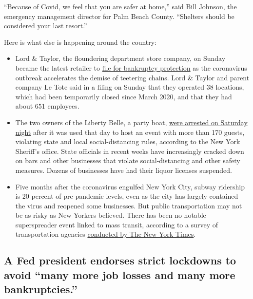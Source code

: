 ``Because of Covid, we feel that you are safer at home,'' said Bill
Johnson, the emergency management director for Palm Beach County.
``Shelters should be considered your last resort.''

Here is what else is happening around the country:

\begin{itemize}
\item
  Lord \& Taylor, the floundering department store company, on Sunday
  became the latest retailer to
  \href{https://www.nytimes3xbfgragh.onion/2020/08/02/business/Lord-and-Taylor-Bankruptcy.html}{file
  for bankruptcy protection} as the coronavirus outbreak accelerates the
  demise of teetering chains. Lord \& Taylor and parent company Le Tote
  said in a filing on Sunday that they operated 38 locations, which had
  been temporarily closed since March 2020, and that they had about 651
  employees.
\item
  The two owners of the Liberty Belle, a party boat,
  \href{https://www.nytimes3xbfgragh.onion/2020/08/02/nyregion/liberty-belle-illegal-party.html}{were
  arrested on Saturday night} after it was used that day to host an
  event with more than 170 guests, violating state and local
  social-distancing rules, according to the New York Sheriff's office.
  State officials in recent weeks have increasingly cracked down on bars
  and other businesses that violate social-distancing and other safety
  measures. Dozens of businesses have had their liquor licenses
  suspended.
\item
  Five months after the coronavirus engulfed New York City, subway
  ridership is 20 percent of pre-pandemic levels, even as the city has
  largely contained the virus and reopened some businesses. But public
  transportation may not be as risky as New Yorkers believed. There has
  been no notable superspreader event linked to mass transit, according
  to a survey of transportation agencies
  \href{https://www.nytimes3xbfgragh.onion/2020/08/02/nyregion/nyc-subway-coronavirus-safety.html}{conducted
  by The New York Times}.
\end{itemize}

\hypertarget{a-fed-president-endorses-strict-lockdowns-to-avoid-many-more-job-losses-and-many-more-bankruptcies}{%
\subsection{A Fed president endorses strict lockdowns to avoid ``many
more job losses and many more
bankruptcies.''}\label{a-fed-president-endorses-strict-lockdowns-to-avoid-many-more-job-losses-and-many-more-bankruptcies}}

